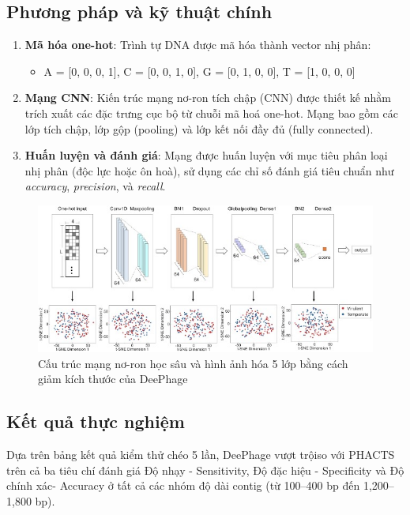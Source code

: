 \subsection*{Phương pháp và kỹ thuật chính}

\begin{enumerate}
    \item \textbf{Mã hóa one-hot}: Trình tự DNA được mã hóa thành vector nhị phân:
    \begin{itemize}
        \item A = [0, 0, 0, 1], C = [0, 0, 1, 0], G = [0, 1, 0, 0], T = [1, 0, 0, 0]
    \end{itemize}
    
    \item \textbf{Mạng CNN}: Kiến trúc mạng nơ-ron tích chập (CNN) được thiết kế nhằm trích xuất các đặc trưng cục bộ từ chuỗi mã hoá one-hot. Mạng bao gồm các lớp tích chập, lớp gộp (pooling) và lớp kết nối đầy đủ (fully connected).

    \item \textbf{Huấn luyện và đánh giá}: Mạng được huấn luyện với mục tiêu phân loại nhị phân (độc lực hoặc ôn hoà), sử dụng các chỉ số đánh giá tiêu chuẩn như \textit{accuracy}, \textit{precision}, và \textit{recall}.
\end{enumerate}
\begin{figure}[H]
    \centering
    \includegraphics[width=1\linewidth]{figures/DeePhage_Model.jpg}
    \caption{Cấu trúc mạng nơ-ron học sâu và hình ảnh hóa 5 lớp bằng cách giảm kích thước của DeePhage}
    \label{fig:DeePhage_model}
\end{figure}

\subsection*{Kết quả thực nghiệm}

Dựa trên bảng kết quả kiểm thử chéo 5 lần, DeePhage vượt trộiso với PHACTS trên cả ba tiêu chí đánh giá Độ nhạy - Sensitivity, Độ đặc hiệu - Specificity và Độ chính xác- Accuracy ở tất cả các nhóm độ dài contig (từ 100–400 bp đến 1,200–1,800 bp).

